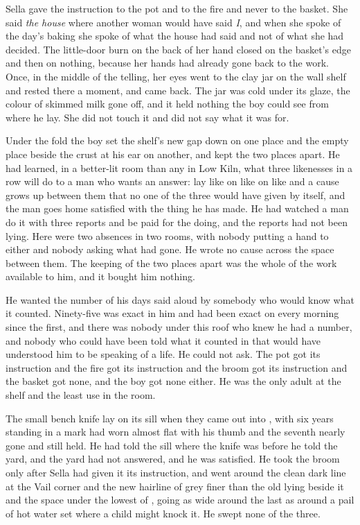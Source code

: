 Sella gave the instruction to the pot and to the fire and never to the basket. She said \emph{the house} where another woman would have said \emph{I}, and when she spoke of the day's baking she spoke of what the house had said and not of what she had decided. The little-door burn on the back of her hand closed on the basket's edge and then on nothing, because her hands had already gone back to the work. Once, in the middle of the telling, her eyes went to the clay jar on the wall shelf and rested there a moment, and came back. The jar was cold under its glaze, the colour of skimmed milk gone off, and it held nothing the boy could see from where he lay. She did not touch it and did not say what it was for.

Under the fold the boy set the shelf's new gap down on one place and the empty place beside the crust at his ear on another, and kept the two places apart. He had learned, in a better-lit room than any in Low Kiln, what three likenesses in a row will do to a man who wants an answer: lay like on like on like and a cause grows up between them that no one of the three would have given by itself, and the man goes home satisfied with the thing he has made. He had watched a man do it with three reports and be paid for the doing, and the reports had not been lying. Here were two absences in two rooms, with nobody putting a hand to either and nobody asking what had gone. He wrote no cause across the space between them. The keeping of the two places apart was the whole of the work available to him, and it bought him nothing.

He wanted the number of his days said aloud by somebody who would know what it counted. Ninety-five was exact in him and had been exact on every morning since the first, and there was nobody under this roof who knew he had a number, and nobody who could have been told what it counted in  that would have understood him to be speaking of a life. He could not ask. The pot got its instruction and the fire got its instruction and the broom got its instruction and the basket got none, and the boy got none either. He was the only adult at the shelf and the least use in the room.

\scenebreak

The small bench knife lay on its sill when they came out into , with six years standing in a mark  had worn almost flat with his thumb and the seventh nearly gone and still held. He had told the sill where the knife was before he told the yard, and the yard had not answered, and he was satisfied. He took the broom only after Sella had given it its instruction, and went around the clean dark line at the Vail corner and the new hairline of grey finer than the old lying beside it and the space under the lowest of , going as wide around the last as around a pail of hot water set where a child might knock it. He swept none of the three.

